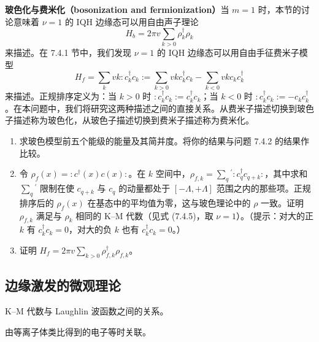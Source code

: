 \textbf{玻色化与费米化（bosonization and fermionization）}当 $m=1$ 时，本节的讨论意味着 $\nu=1$ 的 IQH 边缘态可以用自由声子理论
\begin{equation*}
H_b=2\pi v\sum_{k>0}\rho_k^\dagger\rho_k
\end{equation*}
来描述。在 7.4.1 节中，我们发现 $\nu=1$ 的 IQH 边缘态可以用自由手征费米子模型
\begin{equation*}
H_f=\sum_k vk:c_k^\dagger c_k:=\sum_{k>0}vkc_k^\dagger c_k-\sum_{k<0}vkc_kc_k^\dagger
\end{equation*}
来描述。正规排序定义为：当 $k>0$ 时 $:c_k^\dagger c_k:=c_k^\dagger c_k$；当 $k<0$ 时 $:c_k^\dagger c_k:=-c_kc_k^\dagger$。在本问题中，我们将研究这两种描述之间的直接关系。从费米子描述切换到玻色子描述称为玻色化，从玻色子描述切换到费米子描述称为费米化。
\begin{enumerate}
\item 求玻色模型前五个能级的能量及其简并度。将你的结果与问题 7.4.2 的结果作比较。
\item 令 $\rho_f(x)=:c^\dagger(x)c(x):$。在 $k$ 空间中，$\rho_{f,k}=\sum_q{}^{\prime}:c_q^\dagger c_{q+k}:$，其中求和 $\sum_q{}^{\prime}$ 限制在使 $c_{q+k}$ 与 $c_q$ 的动量都处于 $[-\Lambda,+\Lambda]$ 范围之内的那些项。正规排序后的 $\rho_f(x)$ 在基态中的平均值为零，这与玻色理论中的 $\rho$ 一致。证明 $\rho_{f,k}$ 满足与 $\rho_k$ 相同的 K--M 代数（见式 (7.4.5)，取 $\nu=1$）。（提示：对大的正 $k$ 有 $c_k^\dagger c_k=0$，对大的负 $k$ 也有 $c_k^\dagger c_k=0$。）
\item 证明 $H_f=2\pi v\sum_{k>0}\rho_{f,k}^\dagger\rho_{f,k}$。
\end{enumerate}

\subsection{边缘激发的微观理论}

\begin{keypoints}
\item K--M 代数与 Laughlin 波函数之间的关系。
\item 由等离子体类比得到的电子等时关联。
\end{keypoints}


